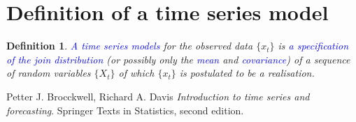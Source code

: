\documentclass[11pt, oneside]{article}   	%
\newtheorem{definition}{Definition}
\begin{document}
\section{Definition of a time series model}
\begin{definition}
\textcolor{blue}{A time series models} for the observed data $\{ x_{t}\}$ is \textcolor{blue}{a specification of the join distribution} (or possibly only the \textcolor{blue}{mean} and \textcolor{blue}{covariance}) of a sequence of random variables $\{ X_{t}\}$ of which $\{ x_{t}\}$ is postulated to be a realisation.
\end{definition}





\begin{thebibliography}{9}
Petter J. Brocckwell, Richard A. Davis 
\textit{Introduction to time series and forecasting}. 
Springer Texts in Statistics, second edition.
 
\end{thebibliography}
\end{document}
